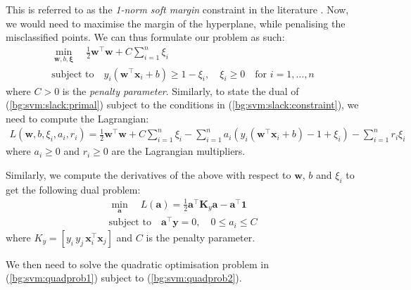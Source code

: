 \documentclass[12pt, twoside, a4paper]{report}
\def\vec{\boldsymbol}
\begin{document}
This is referred to as the \textit{1-norm soft margin} constraint in the literature \cite{RefWorks:127}. Now, we would need to maximise the margin of the hyperplane, while penalising the misclassified points. We can thus formulate our problem as such:
\begin{gather}
\min_{\vec{w}, b, \vec{\xi}} \quad \frac{1}{2}\vec{w}^\top \vec{w} + C \sum_{i=1}^n \xi_i \label{bg:svm:slack:primal} \\
\text{subject to} \quad y_i(\vec{w}^\top \vec{x}_i + b) \geq 1 - \xi_i , \quad 
\xi_i \geq 0 \quad \text{for $i = 1, \dots , n$}\label{bg:svm:slack:constraint}
\end{gather}
where $C>0$ is the \textit{penalty parameter}. Similarly, to state the dual of (\ref{bg:svm:slack:primal}) subject to the conditions in (\ref{bg:svm:slack:constraint}), we need to compute the Lagrangian:
\begin{align*}
L(\vec{w}, b, \xi_i, a_i, r_i) =
\frac{1}{2} \vec{w}^\top \vec{w} + C \sum_{i=1}^n \xi_i - \sum_{i=1}^n a_i(y_i(\vec{w}^\top \vec{x}_i + b) - 1 + \xi_i) - \sum_{i=1}^n r_i\xi_i
\end{align*}
where $a_i \geq 0$ and $r_i \geq 0$ are the Lagrangian multipliers.

Similarly, we compute the derivatives of the above with respect to $\vec{w}$, $b$ and $\xi_i$ to get the following dual problem:
\begin{gather}
\min_{\vec{a}} \quad L(\vec{a}) = \frac{1}{2}\vec{a}^\top \vec{K}_y \vec{a} - \vec{a}^\top \vec{1} \label{bg:svm:quadprob1} \\
\text{subject to} \quad \vec{a}^\top \vec{y} = 0, \quad 0 \leq a_i \leq C \label{bg:svm:quadprob2}
\end{gather}
where $K_y = [y_i \, y_j \, \vec{x}_i^\top \vec{x}_j]$ and $C$ is the penalty parameter.


We then need to solve the quadratic optimisation problem in (\ref{bg:svm:quadprob1}) subject to (\ref{bg:svm:quadprob2}).
\end{document}
